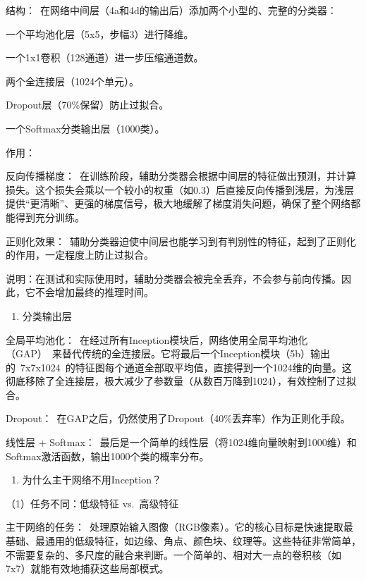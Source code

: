 结构：~在网络中间层（4a和4d的输出后）添加两个小型的、完整的分类器：

一个平均池化层（5x5，步幅3）进行降维。

一个1x1卷积（128通道）进一步压缩通道数。

两个全连接层（1024个单元）。

Dropout层（70\%保留）防止过拟合。

一个Softmax分类输出层（1000类）。

作用：

反向传播梯度：~在训练阶段，辅助分类器会根据中间层的特征做出预测，并计算损失。这个损失会乘以一个较小的权重（如0.3）后直接反向传播到浅层，为浅层提供``更清晰''、更强的梯度信号，极大地缓解了梯度消失问题，确保了整个网络都能得到充分训练。

正则化效果：~辅助分类器迫使中间层也能学习到有判别性的特征，起到了正则化的作用，一定程度上防止过拟合。

说明：在测试和实际使用时，辅助分类器会被完全丢弃，不会参与前向传播。因此，它不会增加最终的推理时间。

\begin{enumerate}
\def\labelenumi{\arabic{enumi}.}
\setcounter{enumi}{3}
\tightlist
\item
  分类输出层
\end{enumerate}

全局平均池化：~在经过所有Inception模块后，网络使用全局平均池化（GAP）~来替代传统的全连接层。它将最后一个Inception模块（5b）输出的~7x7x1024~的特征图每个通道全部取平均值，直接得到一个1024维的向量。这彻底移除了全连接层，极大减少了参数量（从数百万降到1024），有效控制了过拟合。

Dropout：~在GAP之后，仍然使用了Dropout（40\%丢弃率）作为正则化手段。

线性层 + Softmax：~最后是一个简单的线性层（将1024维向量映射到1000维）和Softmax激活函数，输出1000个类的概率分布。

\begin{enumerate}
\def\labelenumi{\arabic{enumi}.}
\setcounter{enumi}{4}
\tightlist
\item
  为什么主干网络不用Inception？
\end{enumerate}

（1）任务不同：低级特征 vs.~高级特征

主干网络的任务：~处理原始输入图像（RGB像素）。它的核心目标是快速提取最基础、最通用的低级特征，如边缘、角点、颜色块、纹理等。这些特征非常简单，不需要复杂的、多尺度的融合来判断。一个简单的、相对大一点的卷积核（如7x7）就能有效地捕获这些局部模式。

